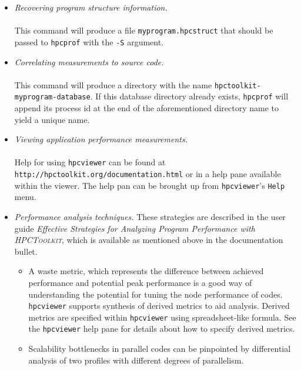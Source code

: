 \documentclass[10pt]{article}
\newcommand{\HPCToolkit}{\textsc{HPCToolkit}}
\begin{document}
\begin{itemize}
\item{ \em Recovering program structure information.}\\
\\[1ex]
This command will produce a file {\tt myprogram.hpcstruct} that should be passed to {\tt hpcprof} with the {\tt -S} argument.
\item{ \em Correlating measurements to source code.}\\
\\[1ex]
This command will produce a directory with the name {\tt hpctoolkit-myprogram-database}. If this database directory already exists, {\tt hpcprof} will append its process id at the end of the aforementioned directory name to yield a unique name.
\item{ \em Viewing application performance measurements.}\\
\\[1ex]
Help for using {\tt hpcviewer} can be found at  {\tt http://hpctoolkit.org/documentation.html}  or in a help pane available within the viewer. The help pan can be brought up from {\tt hpcviewer}'s {\tt Help} menu.
\item{ \em Performance analysis techniques.}
These strategies are described in the user guide {\em Effective Strategies for Analyzing Program Performance with \HPCToolkit{}}, which is available as mentioned above in the documentation bullet.
\begin{itemize}
\item
A waste metric, which represents the difference between achieved performance and potential peak performance is a good way of understanding the potential for tuning the node performance of codes. {\tt hpcviewer} supports synthesis of derived metrics to aid analysis. Derived metrics are specified within {\tt hpcviewer} using spreadsheet-like formula. See the {\tt hpcviewer} help pane for details about how to specify derived metrics.
\item
Scalability bottlenecks in parallel codes can be pinpointed by differential analysis of two profiles with different degrees of parallelism. 
\end{itemize}
\end{itemize}



% 
% 
% 
\end{document}
